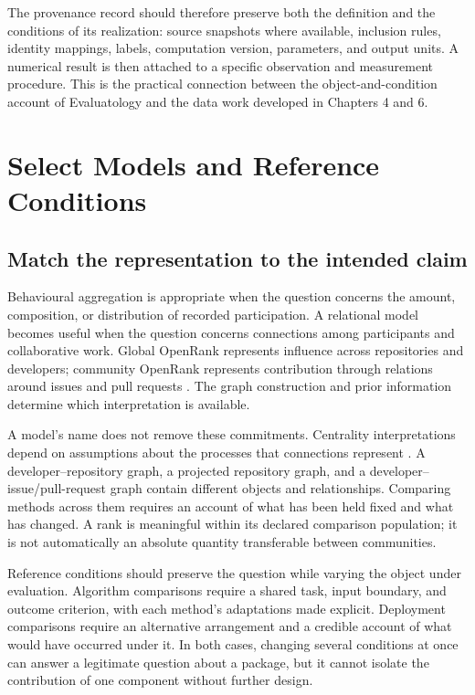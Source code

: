 The provenance record should therefore preserve both the definition and the conditions of its realization: source snapshots where available, inclusion rules, identity mappings, labels, computation version, parameters, and output units. A numerical result is then attached to a specific observation and measurement procedure. This is the practical connection between the object-and-condition account of Evaluatology and the data work developed in Chapters 4 and 6.

\section{Select Models and Reference Conditions}
\label{sec:ch3-models}

\subsection{Match the representation to the intended claim}
Behavioural aggregation is appropriate when the question concerns the amount, composition, or distribution of recorded participation. A relational model becomes useful when the question concerns connections among participants and collaborative work. Global OpenRank represents influence across repositories and developers; community OpenRank represents contribution through relations around issues and pull requests \citep{han2026rank,zhao2024}. The graph construction and prior information determine which interpretation is available.

A model's name does not remove these commitments. Centrality interpretations depend on assumptions about the processes that connections represent \citep{borgatti2005}. A developer--repository graph, a projected repository graph, and a developer--issue/pull-request graph contain different objects and relationships. Comparing methods across them requires an account of what has been held fixed and what has changed. A rank is meaningful within its declared comparison population; it is not automatically an absolute quantity transferable between communities.

Reference conditions should preserve the question while varying the object under evaluation. Algorithm comparisons require a shared task, input boundary, and outcome criterion, with each method's adaptations made explicit. Deployment comparisons require an alternative arrangement and a credible account of what would have occurred under it. In both cases, changing several conditions at once can answer a legitimate question about a package, but it cannot isolate the contribution of one component without further design.


